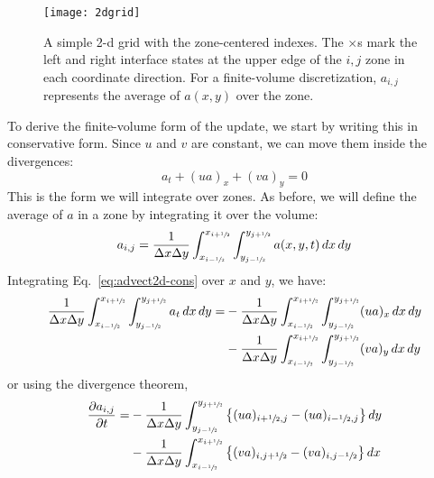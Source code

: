 \begin{figure}[h]
\centering
\texttt{[image: 2dgrid]}
\caption[A 2-d grid with zone-centered indexes]{\label{fig:2dgrid} A
  simple 2-d grid with the zone-centered indexes.  The $\times$s mark
  the left and right interface states at the upper edge of the $i,j$ zone in each
  coordinate direction.  For a finite-volume discretization, $a_{i,j}$
  represents the average of $a(x,y)$ over the zone.}
\end{figure}

To derive the finite-volume form of the update, we start by writing
this in conservative form.  Since $u$ and $v$ are constant, we can
move them inside the divergences:
\begin{equation}
a_t + (u a)_x + (v a)_y = 0
\label{eq:advect2d-cons}
\end{equation}
This is the form we will integrate over zones.  As before, we will
define the average of $a$ in a zone by integrating it over the
volume:
\begin{equation}
a_{i,j} = \frac{1}{\Delta x \Delta y}
   \int_{x_{i-{\sfrac{1}{2}}}}^{x_{i+{\sfrac{1}{2}}}} \int_{y_{j-{\sfrac{1}{2}}}}^{y_{j+{\sfrac{1}{2}}}}
   a(x,y,t) \, dx \, dy
\end{equation}
Integrating Eq.~\ref{eq:advect2d-cons} over $x$ and $y$, we have:
\begin{align}
\frac{1}{\Delta x \Delta y}
  \int_{x_{i-{\sfrac{1}{2}}}}^{x_{i+{\sfrac{1}{2}}}}
  \int_{y_{j-{\sfrac{1}{2}}}}^{y_{j+{\sfrac{1}{2}}}} a_t \, dx \, dy =
  &- \frac{1}{\Delta x \Delta y}
       \int_{x_{i-{\sfrac{1}{2}}}}^{x_{i+{\sfrac{1}{2}}}} \int_{y_{j-{\sfrac{1}{2}}}}^{y_{j+{\sfrac{1}{2}}}}
      (u a)_x \, dx \, dy \nonumber \\
  &- \frac{1}{\Delta x \Delta y}
       \int_{x_{i-{\sfrac{1}{2}}}}^{x_{i+{\sfrac{1}{2}}}} \int_{y_{j-{\sfrac{1}{2}}}}^{y_{j+{\sfrac{1}{2}}}}
      (v a)_y \, dx \, dy
\end{align}
or using the divergence theorem,
\begin{align}
\label{eq:adv:multiddivergence}
 \frac{\partial a_{i,j}}{\partial t} =
  &- \frac{1}{\Delta x\Delta y} \int_{y_{j-{\sfrac{1}{2}}}}^{y_{j+{\sfrac{1}{2}}}}
     \left \{ (u a)_{i+{\sfrac{1}{2}},j} - (u a)_{i-{\sfrac{1}{2}},j} \right \} dy \nonumber \\
  &- \frac{1}{\Delta x\Delta y} \int_{x_{i-{\sfrac{1}{2}}}}^{x_{i+{\sfrac{1}{2}}}}
     \left \{ (v a)_{i,j+{\sfrac{1}{2}}} - (v a)_{i,j-{\sfrac{1}{2}}} \right \} dx
\end{align}

